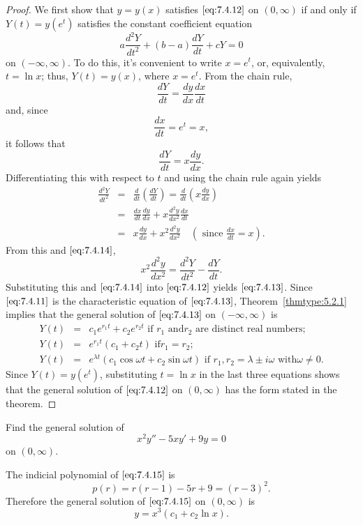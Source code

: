 \documentclass{ximera}
\begin{document}
\begin{proof}
We first show that $y=y(x)$ satisfies $\eqref{eq:7.4.12}$ on
$(0,\infty)$ if and only if $Y(t)=y(e^t)$ satisfies the constant
coefficient equation
\begin{equation} \label{eq:7.4.13}
a\frac{d^2Y}{dt^2}+(b-a)\frac{dY}{dt}+cY=0
\end{equation} on
$(-\infty,\infty)$. To do this, it's convenient to write $x=e^t$, or,
equivalently, $t=\ln x$;   thus, $Y(t)=y(x)$, where $x=e^t$. From the
chain rule,
$$
\frac{dY}{dt}=\frac{dy}{dx}\frac{dx}{dt}
$$
and, since
$$
\frac{dx}{dt}=e^t=x,
$$
it follows that
\begin{equation} \label{eq:7.4.14}
\frac{dY}{dt}=x\frac{dy}{dx}.
\end{equation}
Differentiating this with
respect to $t$ and using the chain rule again yields
\begin{eqnarray*}
\frac{d^2Y}{dt^2}&=&\frac{d}{dt}\left(\frac{dY}{dt}\right)=\frac{d}{dt}\left(x\frac{dy}{dx}\right)\\
&=&\frac{dx}{dt}\frac{dy}{dx}+x\frac{d^2y}{dx^2}\frac{dx}{dt}\\
&=&x\frac{dy}{dx}+x^2\frac{d^2y}{dx^2}\quad\left(\mbox{ since } \frac{dx}{dt}=x\right).
\end{eqnarray*}
From this and $\eqref{eq:7.4.14}$,
$$
x^2\frac{d^2y}{dx^2}=\frac{d^2Y}{dt^2}-\frac{dY}{dt}.
$$
Substituting this and $\eqref{eq:7.4.14}$ into $\eqref{eq:7.4.12}$ yields
$\eqref{eq:7.4.13}$. Since $\eqref{eq:7.4.11}$ is the characteristic equation of
$\eqref{eq:7.4.13}$, Theorem~\ref{thmtype:5.2.1} implies that the general solution
of $\eqref{eq:7.4.13}$ on $(-\infty,\infty)$ is
\begin{eqnarray*}
Y(t)&=&c_1e^{r_1t}+c_2e^{r_2t}\mbox{ if $r_1$ and
$r_2$ are distinct real numbers;  }\\
 Y(t)&=&e^{r_1t}(c_1+c_2t)\mbox{ if
$r_1=r_2$;  }\\
Y(t)&=&e^{\lambda t }\left(c_1\cos\omega
t+c_2\sin\omega t \right)\mbox{ if $r_1,r_2=\lambda\pm i\omega$ with
$\omega\neq0$}.
\end{eqnarray*}
Since $Y(t)=y(e^t)$, substituting $t=\ln x$ in the last three equations shows that the general solution of $\eqref{eq:7.4.12}$ on
$(0,\infty)$ has the form stated in the theorem.
\end{proof}

\begin{example}\label{example:7.4.6}
 Find the general solution of
\begin{equation} \label{eq:7.4.15}
x^2y''-5xy'+9y=0
\end{equation}
on $(0,\infty)$.
\begin{explanation}
The indicial polynomial of $\eqref{eq:7.4.15}$ is
$$
p(r)=r(r-1)-5r+9=(r-3)^2.
$$
Therefore the general solution of $\eqref{eq:7.4.15}$ on $(0,\infty)$ is
$$
y=x^3(c_1+c_2 \ln x).
$$
\end{explanation}
\end{example}
\end{document}
